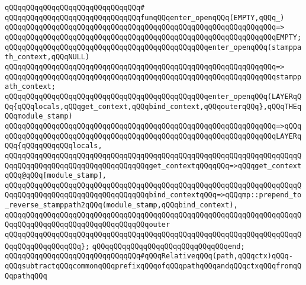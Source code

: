 \verb|qQQqqQQqqQQqqQQqqQQqqQQqqQQqqQQq#|\newline
\verb|qQQqqQQqqQQqqQQqqQQqqQQqqQQqqQQqfunqQQqenter_openqQQq(EMPTY,qQQq_)|\newline
\verb|qQQqqQQqqQQqqQQqqQQqqQQqqQQqqQQqqQQqqQQqqQQqqQQqqQQqqQQqqQQqqQQq=>|\newline
\verb|qQQqqQQqqQQqqQQqqQQqqQQqqQQqqQQqqQQqqQQqqQQqqQQqqQQqqQQqqQQqqQQqEMPTY;|\newline
\newline
\verb|qQQqqQQqqQQqqQQqqQQqqQQqqQQqqQQqqQQqqQQqqQQqqQQqenter_openqQQq(stamppath_context,qQQqNULL)|\newline
\verb|qQQqqQQqqQQqqQQqqQQqqQQqqQQqqQQqqQQqqQQqqQQqqQQqqQQqqQQqqQQqqQQq=>|\newline
\verb|qQQqqQQqqQQqqQQqqQQqqQQqqQQqqQQqqQQqqQQqqQQqqQQqqQQqqQQqqQQqqQQqstamppath_context;|\newline
\newline
\verb|qQQqqQQqqQQqqQQqqQQqqQQqqQQqqQQqqQQqqQQqqQQqqQQqenter_openqQQq(LAYERqQQq{qQQqlocals,qQQqget_context,qQQqbind_context,qQQqouterqQQq},qQQqTHEqQQqmodule_stamp)|\newline
\verb|qQQqqQQqqQQqqQQqqQQqqQQqqQQqqQQqqQQqqQQqqQQqqQQqqQQqqQQqqQQqqQQq=>qQQq|\newline
\verb|qQQqqQQqqQQqqQQqqQQqqQQqqQQqqQQqqQQqqQQqqQQqqQQqqQQqqQQqqQQqqQQqLAYERqQQq{qQQqqQQqqQQqlocals,|\newline
\verb|qQQqqQQqqQQqqQQqqQQqqQQqqQQqqQQqqQQqqQQqqQQqqQQqqQQqqQQqqQQqqQQqqQQqqQQqqQQqqQQqqQQqqQQqqQQqqQQqqQQqqQQqget_contextqQQqqQQq=>qQQqget_contextqQQq@qQQq[module_stamp],|\newline
\verb|qQQqqQQqqQQqqQQqqQQqqQQqqQQqqQQqqQQqqQQqqQQqqQQqqQQqqQQqqQQqqQQqqQQqqQQqqQQqqQQqqQQqqQQqqQQqqQQqqQQqqQQqbind_contextqQQq=>qQQqmp::prepend_to_reverse_stamppath2qQQq(module_stamp,qQQqbind_context),|\newline
\verb|qQQqqQQqqQQqqQQqqQQqqQQqqQQqqQQqqQQqqQQqqQQqqQQqqQQqqQQqqQQqqQQqqQQqqQQqqQQqqQQqqQQqqQQqqQQqqQQqqQQqqQQqouter|\newline
\verb|qQQqqQQqqQQqqQQqqQQqqQQqqQQqqQQqqQQqqQQqqQQqqQQqqQQqqQQqqQQqqQQqqQQqqQQqqQQqqQQqqQQqqQQq};|\newline
\verb|qQQqqQQqqQQqqQQqqQQqqQQqqQQqqQQqend;|\newline
\newline
\newline
\newline
\verb|qQQqqQQqqQQqqQQqqQQqqQQqqQQqqQQq#qQQqRelativeqQQq(path,qQQqctx)qQQq-qQQqsubtractqQQqcommonqQQqprefixqQQqofqQQqpathqQQqandqQQqctxqQQqfromqQQqpathqQQq|\newline
